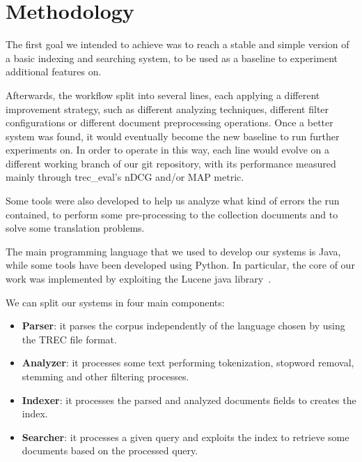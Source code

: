 \section{Methodology}
\label{sec:methodology}


The first goal we intended to achieve was to reach a stable and simple version of a basic indexing and searching system, to be used as a baseline to experiment additional features on. 
\par
Afterwards, the workflow split into several lines, each applying a different improvement strategy, such as different analyzing techniques, different filter configurations or different document preprocessing operations. Once a better system was found, it would eventually become the new baseline to run further experiments on.
In order to operate in this way, each line would evolve on a different working branch of our git repository, with its performance measured mainly through trec\_eval's nDCG and/or MAP metric.
\par
Some tools were also developed to help us analyze what kind of errors the run contained, to perform some pre-processing to the collection documents and to solve some translation problems.
\par
The main programming language that we used to develop our systems is Java, while some tools have been developed using Python. In particular, the core of our work was implemented by exploiting the Lucene java library~\cite{lucene}.
\par
We can split our systems in four main components:
\begin{itemize}
	\item \textbf{Parser}: it parses the corpus independently of the language chosen by using the TREC file format.
	\item \textbf{Analyzer}: it processes some text performing tokenization, stopword removal, stemming and other filtering processes.
	\item \textbf{Indexer}: it processes the parsed and analyzed documents fields to creates the index.
	\item \textbf{Searcher}: it processes a given query and exploits the index to retrieve some documents based on the processed query.
\end{itemize}

